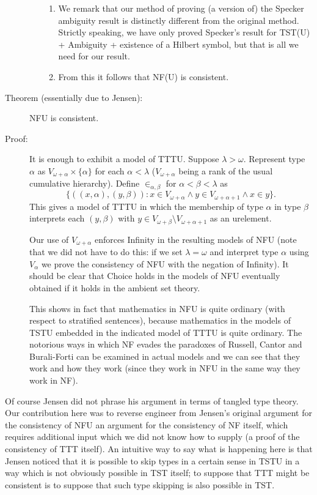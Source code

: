 \documentclass[112pt]{article}
\begin{document}
\begin{description}
\begin{enumerate}
\begin{enumerate}
\item  We remark that our method of proving (a version of) the Specker ambiguity result is distinctly different from the original method.  Strictly speaking, we have only proved Specker's result for TST(U) + Ambiguity + existence of a Hilbert symbol, but that is all we need for our result.

\item From this it follows that NF(U) is consistent.

\end{enumerate}

\end{enumerate}

\item[Theorem (essentially due to Jensen):]  NFU is consistent.

\item[Proof:]  It is enough to exhibit a model of TTTU.  Suppose $\lambda>\omega$.  Represent type $\alpha$ as $V_{\omega+\alpha} \times \{\alpha\}$ for each $\alpha<\lambda$ ($V_{\omega+\alpha}$ being a rank of the usual cumulative hierarchy).  Define $\in_{\alpha,\beta}$ for
$\alpha<\beta<\lambda$ as $$\{((x,\alpha),(y,\beta)):x \in V_{\omega+\alpha} \wedge y \in V_{\omega+\alpha+1} \wedge x \in y\}.$$  This gives a model of TTTU in which the membership of
type $\alpha$ in type $\beta$ interprets each $(y,\beta)$ with $y \in V_{\omega+\beta} \setminus V_{\omega+\alpha+1}$ as an urelement.

Our use of $V_{\omega+\alpha}$ enforces Infinity in the resulting models of NFU (note that we did not have to do this:  if we set $\lambda=\omega$ and interpret type $\alpha$ using $V_\alpha$ we prove the consistency of NFU with the negation of Infinity).  It should be clear that Choice holds in the models of NFU eventually obtained if it holds in the ambient set theory.

This shows in fact that mathematics in NFU is quite ordinary (with respect to stratified sentences), because mathematics in the models of TSTU embedded in the indicated model of TTTU is quite ordinary.  The notorious ways in which NF evades the paradoxes of Russell, Cantor and Burali-Forti can be examined in actual models and we can see that they work and how they work (since they work in NFU in the same way they work in NF).

\end{description}

Of course Jensen did not phrase his argument in terms of tangled type theory.  Our contribution here was to reverse engineer from Jensen's original argument for the consistency of NFU an argument for the consistency of NF itself, which requires additional input which we did not know how to supply (a proof of the consistency of TTT itself).  An intuitive way to say what is happening here is that Jensen noticed that it is possible to skip types in a certain sense in TSTU in a way which is not obviously possible in TST itself;  to suppose that TTT might be consistent is to suppose that such type skipping is also possible in TST.
\end{document}
